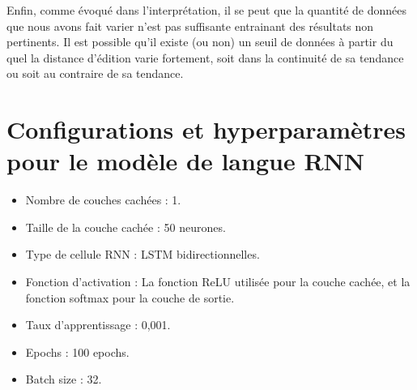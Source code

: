 \documentclass[10pt, french]{article}
\begin{document}
\begin{multicols*}{2}
Enfin, comme évoqué dans l'interprétation, il se peut que la quantité de données que nous avons fait varier n'est pas suffisante entrainant des résultats non pertinents. Il est possible qu'il existe (ou non) un seuil de données à partir du quel la distance d'édition varie fortement, soit dans la continuité de sa tendance ou soit au contraire de sa tendance. 

\clearpage


\pagebreak
\appendix

\section{Configurations et hyperparamètres pour le modèle de langue RNN}
\begin{itemize}
    \item Nombre de couches cachées : 1.
    \item Taille de la couche cachée : 50 neurones.
    \item Type de cellule RNN : LSTM bidirectionnelles.
    \item Fonction d'activation : La fonction ReLU utilisée pour la couche cachée, et  la fonction softmax pour la couche de sortie.
    \item Taux d'apprentissage : 0,001.
    \item Epochs : 100 epochs.
    \item Batch size : 32.
\end{itemize}

\end{multicols*}
	
\end{document}
